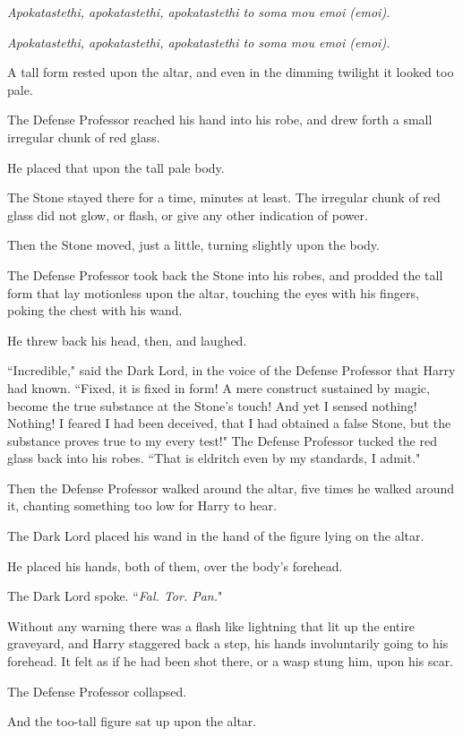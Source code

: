 \emph{Apokatastethi, apokatastethi, apokatastethi to soma mou emoi (emoi).}

\emph{Apokatastethi, apokatastethi, apokatastethi to soma mou emoi (emoi).}

A tall form rested upon the altar, and even in the dimming twilight it looked too pale.

The Defense Professor reached his hand into his robe, and drew forth a small irregular chunk of red glass.

He placed that upon the tall pale body.

The Stone stayed there for a time, minutes at least. The irregular chunk of red glass did not glow, or flash, or give any other indication of power.

Then the Stone moved, just a little, turning slightly upon the body.

The Defense Professor took back the Stone into his robes, and prodded the tall form that lay motionless upon the altar, touching the eyes with his fingers, poking the chest with his wand.

He threw back his head, then, and laughed.

``Incredible," said the Dark Lord, in the voice of the Defense Professor that Harry had known. ``Fixed, it is fixed in form! A mere construct sustained by magic, become the true substance at the Stone's touch! And yet I sensed nothing! Nothing! I feared I had been deceived, that I had obtained a false Stone, but the substance proves true to my every test!" The Defense Professor tucked the red glass back into his robes. ``That is eldritch even by my standards, I admit."

Then the Defense Professor walked around the altar, five times he walked around it, chanting something too low for Harry to hear.

The Dark Lord placed his wand in the hand of the figure lying on the altar.

He placed his hands, both of them, over the body's forehead.

The Dark Lord spoke. ``\emph{Fal. Tor. Pan.}"

Without any warning there was a flash like lightning that lit up the entire graveyard, and Harry staggered back a step, his hands involuntarily going to his forehead. It felt as if he had been shot there, or a wasp stung him, upon his scar.

The Defense Professor collapsed.

And the too-tall figure sat up upon the altar.

